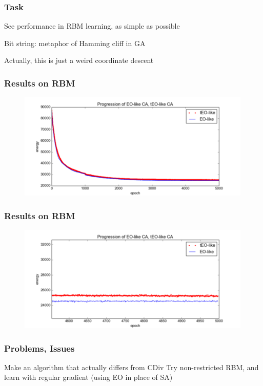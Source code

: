 \documentclass{beamer}
\begin{document}
\begin{frame}
  \frametitle{Task}
  See performance in RBM learning, as simple as possible

  Bit string: metaphor of Hamming cliff in GA

  Actually, this is just a weird coordinate descent
\end{frame}

\begin{frame}
  \frametitle{Results on RBM}
  \begin{figure}
    \includegraphics{eo_rbm_unzoomed}
  \end{figure}
\end{frame}

\begin{frame}
  \frametitle{Results on RBM}
  \begin{figure}
    \includegraphics{eo_rbm_zoomed}
  \end{figure}
\end{frame}

\begin{frame}
  \frametitle{Problems, Issues}
  Make an algorithm that actually differs from CDiv
  Try non-restricted RBM, and learn with regular gradient
  (using EO in place of SA)
\end{frame}
\end{document}
